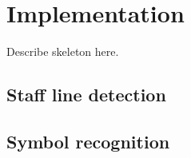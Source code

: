 \section{Implementation}
Describe skeleton here.
\subsection{Staff line detection}
\subsection{Symbol recognition}
